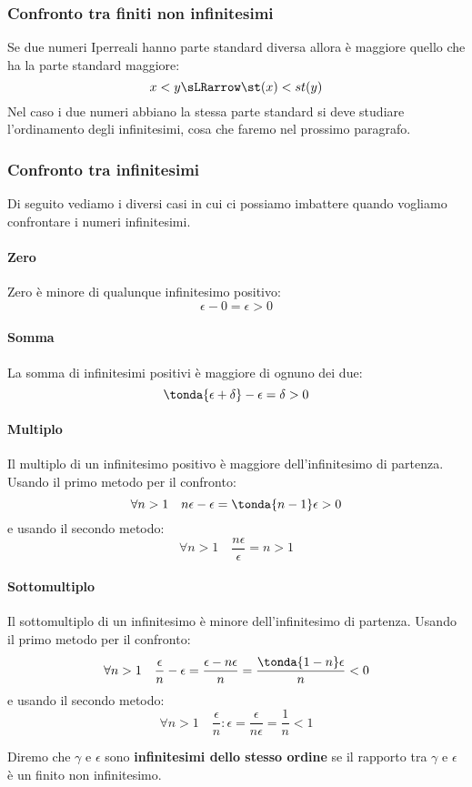 \subsubsection{Confronto tra finiti non infinitesimi}
\label{subsubsec:insnum_confrontoreali}

Se due numeri Iperreali hanno parte standard diversa allora è maggiore 
quello 
che ha la parte standard maggiore:
\[x < y \sLRarrow \st(x) < st(y)\]
Nel caso i due numeri abbiano la stessa parte standard si deve studiare 
l'ordinamento degli infinitesimi, cosa che faremo nel prossimo paragrafo.

\subsubsection{Confronto tra infinitesimi}
\label{subsubsec:insnum_confrontoreali}

Di seguito vediamo i diversi casi in cui ci possiamo 
imbattere quando vogliamo confrontare i numeri infinitesimi.

\paragraph{Zero}
Zero è minore di qualunque infinitesimo positivo:
\[\epsilon-0 = \epsilon>0\]
\paragraph{Somma}
La somma di infinitesimi positivi è maggiore di ognuno dei due:
\[\tonda{\epsilon+\delta}-\epsilon = \delta > 0\]
\paragraph{Multiplo}
Il multiplo di un infinitesimo positivo è maggiore dell'infinitesimo di 
partenza. Usando il primo metodo per il confronto:
\[\forall n > 1 \quad n\epsilon-\epsilon = \tonda{n-1}\epsilon > 0\]
e usando il secondo metodo: 
\[\forall n > 1 \quad \frac{n\epsilon}{\epsilon} = n > 1\]
\paragraph{Sottomultiplo}
Il sottomultiplo di un infinitesimo è minore dell'infinitesimo di partenza. 
Usando il primo metodo per il confronto:
\[\forall n > 1 \quad \frac{\epsilon}{n}-\epsilon = 
                      \frac{\epsilon-n\epsilon}{n} = 
                      \frac{\tonda{1-n}\epsilon}{n} < 0\]
e usando il secondo metodo: 
\[\forall n > 1 \quad \frac{\epsilon}{n}:\epsilon =
                      \frac{\epsilon}{n\epsilon} =
                      \frac{1}{n} < 1\]
\begin{definizione}
 Diremo che \(\gamma\) e \(\epsilon\) sono \textbf{infinitesimi dello 
stesso ordine} se il rapporto tra \(\gamma\) e \(\epsilon\) è un 
finito non infinitesimo.
\end{definizione}
